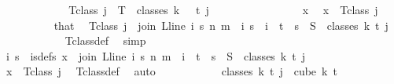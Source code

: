 \begin{isabellebody}
\ \ \ \ \isamarkupfalse%
\isanewline
\ \ \ \ \ \ \isamarkupfalse%
\ {\isachardoublequoteopen}T{\isacharunderscore}{\kern0pt}class\ j\ {\isasymsubseteq}\ T\ {\isacharbackquote}{\kern0pt}\ classes\ {\isacharparenleft}{\kern0pt}k\ {\isacharplus}{\kern0pt}\ {}{\isacharparenright}{\kern0pt}\ t\ j{\isachardoublequoteclose}\isanewline
\ \ \ \ \ \ \isamarkupfalse%
\isanewline
\ \ \ \ \ \ \ \ \isamarkupfalse%
\ x\ \isamarkupfalse%
\ {\isachardoublequoteopen}x\ {\isasymin}\ T{\isacharunderscore}{\kern0pt}class\ j{\isachardoublequoteclose}\isanewline
\ \ \ \ \ \ \ \ \isamarkupfalse%
\ that\ \isamarkupfalse%
\ {\isachardoublequoteopen}T{\isacharunderscore}{\kern0pt}class\ j\ {\isacharequal}{\kern0pt}\ {\isacharbraceleft}{\kern0pt}join\ {\isacharparenleft}{\kern0pt}L{\isacharunderscore}{\kern0pt}line\ i{\isacharparenright}{\kern0pt}\ s\ n\ m\ {\isacharbar}{\kern0pt}\ i\ s\ {\isachardot}{\kern0pt}\ i\ {\isasymin}\ {\isacharbraceleft}{\kern0pt}{\isachardot}{\kern0pt}{\isachardot}{\kern0pt}{\isacharless}{\kern0pt}t{\isacharbraceright}{\kern0pt}\ {\isasymand}\ s\ {\isasymin}\ S\ {\isacharbackquote}{\kern0pt}\ {\isacharparenleft}{\kern0pt}classes\ k\ t\ j{\isacharparenright}{\kern0pt}{\isacharbraceright}{\kern0pt}{\isachardoublequoteclose}\ \isanewline
\ \ \ \ \ \ \ \ \ \ \isamarkupfalse%
\ T{\isacharunderscore}{\kern0pt}class{\isacharunderscore}{\kern0pt}def\ \isamarkupfalse%
\ simp\isanewline
\ \ \ \ \ \ \ \ \isamarkupfalse%
\ \isamarkupfalse%
\ i\ s\ \ is{\isacharunderscore}{\kern0pt}defs{\isacharcolon}{\kern0pt}\ {\isachardoublequoteopen}x\ {\isacharequal}{\kern0pt}\ join\ {\isacharparenleft}{\kern0pt}L{\isacharunderscore}{\kern0pt}line\ i{\isacharparenright}{\kern0pt}\ s\ n\ m\ {\isasymand}\ i\ {\isacharless}{\kern0pt}\ t\ {\isasymand}\ s\ {\isasymin}\ S\ {\isacharbackquote}{\kern0pt}\ {\isacharparenleft}{\kern0pt}classes\ k\ t\ j{\isacharparenright}{\kern0pt}{\isachardoublequoteclose}\ \isanewline
\ \ \ \ \ \ \ \ \ \ \isamarkupfalse%
\ {\isacartoucheopen}x\ {\isasymin}\ T{\isacharunderscore}{\kern0pt}class\ j{\isacartoucheclose}\ \isamarkupfalse%
\ T{\isacharunderscore}{\kern0pt}class{\isacharunderscore}{\kern0pt}def\ \isamarkupfalse%
\ auto\isanewline
\ \ \ \ \ \ \ \ \isamarkupfalse%
\ \isamarkupfalse%
\ {\isacharasterisk}{\kern0pt}{\isacharcolon}{\kern0pt}{\isachardoublequoteopen}classes\ k\ t\ j\ {\isasymsubseteq}\ cube\ k\ {\isacharparenleft}{\kern0pt}t{\isacharplus}{\kern0pt}{}{\isacharparenright}{\kern0pt}{\isachardoublequoteclose}\ \isamarkupfalse%

\end{isabellebody}
